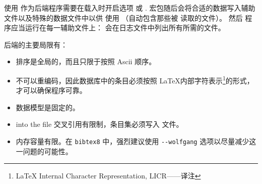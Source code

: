 使用 \BibTeX 作为后端程序需要在载入时开启选项  或 .
\biblatex 宏包随后会将合适的数据写入辅助文件以及特殊的数据文件中以供 \BibTeX 使用
（自动包含那些被 \BibTeX 读取的文件）。
然后  程序应当运行在每一辅助文件上：
\biblatex 会在日志文件中列出所有所需的文件。

\BibTeX 后端的主要局限有：

\begin{itemize}

\item %
排序是全局的，而且只限于按照 Ascii 顺序。


\item %
不可以重编码，因此数据库中的条目必须按照 \LaTeX 内部字符表示\footnote{\LaTeX{} Internal Character Representation, LICR——译注}的形式，才可以确保程序可靠。

\item %
数据模型是固定的。

\item %
into the  file
交叉引用有限制，条目集必须写入  文件。
\item %
内存容量有限。在 \verb|bibtex8| 中，强烈建议使用 \verb|--wolfgang| 选项以尽量减少这一问题的可能性。

\end{itemize}

\endinput
